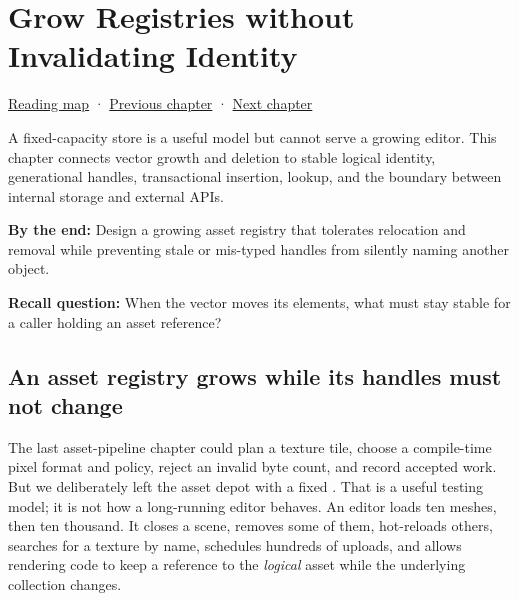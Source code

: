 \chapter{Grow Registries without Invalidating Identity}\label{01-foundations-i-ch006-grow-registries-without-invalidating-identity}\hypertarget{01-foundations-i-ch006}{}\label{stagechapter:01-foundations-i-ch006}

\hypertarget{01-foundations-i-ch006-grow-registries-without-invalidating-identity}{}

\hyperref[volume-reading-map]{Reading map} · \hyperref[01-foundations-i-ch005-generic-asset-pipelines-without-hidden-contracts]{Previous chapter} · \hyperref[01-foundations-i-ch007-typed-interfaces-identity-and-data-structures]{Next chapter}

A fixed-capacity store is a useful model but cannot serve a growing editor. This chapter connects vector growth and deletion to stable logical identity, generational handles, transactional insertion, lookup, and the boundary between internal storage and external APIs.

\textbf{By the end:} Design a growing asset registry that tolerates relocation and removal while preventing stale or mis-typed handles from silently naming another object.

\textbf{Recall question:} When the vector moves its elements, what must stay stable for a caller holding an asset reference?

\section{An asset registry grows while its handles must not change}\label{01-foundations-i-ch006-an-asset-registry-grows-while-its-handles-must-not-change}

\hypertarget{01-foundations-i-ch006-an-asset-registry-grows-while-its-handles-must-not-change}{}

The last asset-pipeline chapter could plan a texture tile, choose a compile-time pixel format and policy, reject an invalid byte count, and record accepted work. But we deliberately left the asset depot with a fixed . That is a useful testing model; it is not how a long-running editor behaves. An editor loads ten meshes, then ten thousand. It closes a scene, removes some of them, hot-reloads others, searches for a texture by name, schedules hundreds of uploads, and allows rendering code to keep a reference to the \emph{logical} asset while the underlying collection changes.


